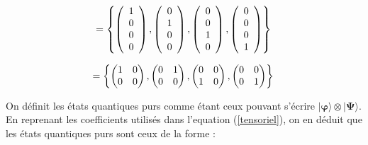 \documentclass[a4paper,12pt]{report}
\newcommand{\quSt}[1]{\bm{|#1\rangle}}
\begin{document}
\begin{equation}
	 =  \left\{ \left( \begin{array}{c} 1 \\ 0 \\ 0 \\ 0 \end{array} \right ), \left( \begin{array}{c} 0 \\ 1 \\ 0 \\ 0 \end{array} \right ), \left( \begin{array}{c} 0 \\ 0 \\ 1 \\ 0 \end{array} \right ), \left( \begin{array}{c} 0 \\ 0 \\ 0 \\ 1 \end{array} \right ) \right\} \\
\end{equation}

\vspace{1\baselineskip}

\begin{equation}
	 =  \left\{ \left( \begin{matrix} 1 & 0 \\ 0 & 0 \end{matrix} \right ), \left( \begin{matrix} 0 & 1 \\ 0 & 0 \end{matrix} \right ), \left( \begin{matrix} 0 & 0 \\ 1 & 0 \end{matrix} \right ), \left( \begin{matrix} 0 & 0 \\ 0 & 1 \end{matrix} \right ) \right\} \\
\end{equation}

\vspace{1\baselineskip}

\par{
	On définit les états quantiques purs comme étant ceux pouvant s'écrire $\quSt{\varphi} \otimes \quSt{\Psi}$. En reprenant les coefficients utilisés dans l'equation (\ref{tensoriel}), on en déduit que les états quantiques purs sont ceux de la forme :
}
\end{document}
